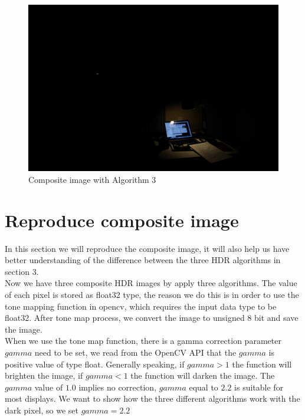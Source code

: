 \documentclass[10pt,twocolumn,letterpaper]{article}
\begin{document}
\begin{figure}[bhp]
\includegraphics[width=\columnwidth]{images/hdr/combined/HDR_img_method_3}
\caption{Composite image with Algorithm 3}

\label{fig:HDR_img_method_3}
\end{figure}



\section{Reproduce composite image}
\label{sec:reproduce}
In this section we will reproduce the composite image, it will also help us have better understanding of the difference between the three HDR algorithms in section 3. \\

Now we have three composite HDR images by apply three algorithms. The value of each pixel is stored as float32 type, the reason we do this is in order to use the tone mapping function in opencv, which requires the input data type to be float32.
After tone map process, we convert the image to unsigned 8 bit and save the image. \\

When we use the tone map function, there is a gamma correction parameter $gamma$ need to be set, we read from the OpenCV API that the $gamma$ is positive value of type float. Generally speaking, if $gamma > 1$ the function will brighten the image, if $gamma < 1$ the function will darken the image. The $gamma$ value of $1.0$ implies no correction, $gamma$ equal to $2.2$ is suitable for most displays. We want to show how the three different algorithms work with the dark pixel, so we set $gamma = 2.2$ \\
\end{document}
